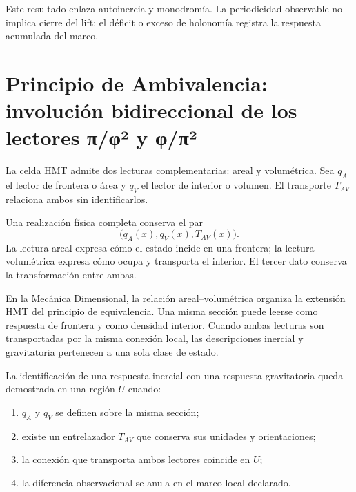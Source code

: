 Este resultado enlaza autoinercia y monodromía. La periodicidad observable no
implica cierre del lift; el déficit o exceso de holonomía registra la
respuesta acumulada del marco.

\section{Principio de Ambivalencia: involución bidireccional de los lectores π/φ² y φ/π²}

La celda HMT admite dos lecturas complementarias: areal y volumétrica. Sea
\(q_A\) el lector de frontera o área y \(q_V\) el lector de interior o
volumen. El transporte \(T_{AV}\) relaciona ambos sin identificarlos.

\begin{principle}
Una realización física completa conserva el par
\begin{equation}
 \bigl(q_A(x),q_V(x),T_{AV}(x)\bigr).
 \label{eq:ambivalencia-av}
\end{equation}
La lectura areal expresa cómo el estado incide en una frontera; la lectura
volumétrica expresa cómo ocupa y transporta el interior. El tercer dato
conserva la transformación entre ambas.
\end{principle}

En la Mecánica Dimensional, la relación areal--volumétrica organiza la
extensión HMT del principio de equivalencia. Una misma sección puede leerse
como respuesta de frontera y como densidad interior. Cuando ambas lecturas
son transportadas por la misma conexión local, las descripciones inercial y
gravitatoria pertenecen a una sola clase de estado.

\begin{criterion}
La identificación de una respuesta inercial con una respuesta gravitatoria
queda demostrada en una región \(U\) cuando:
\begin{enumerate}
 \item \(q_A\) y \(q_V\) se definen sobre la misma sección;
 \item existe un entrelazador \(T_{AV}\) que conserva sus unidades y
       orientaciones;
 \item la conexión que transporta ambos lectores coincide en \(U\);
 \item la diferencia observacional se anula en el marco local declarado.
\end{enumerate}
\end{criterion}

